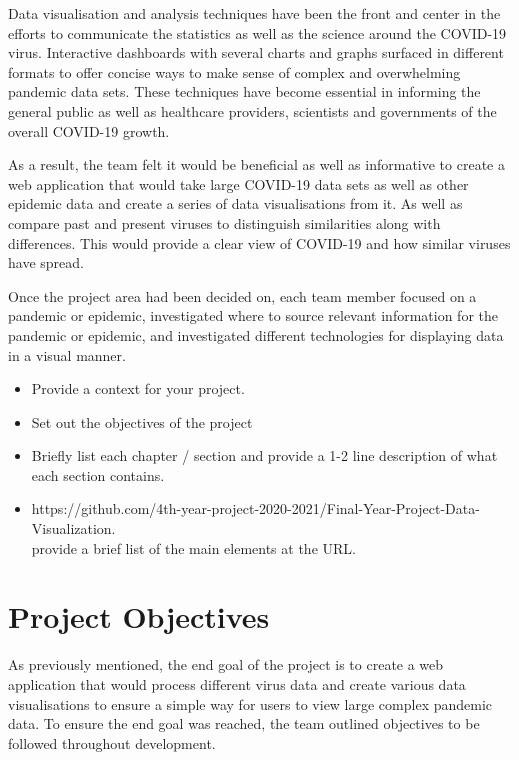 \vspace{5mm} %

Data visualisation and analysis techniques have been the front and center in the efforts to communicate the statistics as well as the science around the COVID-19 virus. Interactive dashboards with several charts and graphs surfaced in different formats to offer concise ways to make sense of complex and overwhelming pandemic data sets. These techniques have become essential in informing the general public as well as healthcare providers, scientists and governments of the overall COVID-19 growth. 

\vspace{5mm} %

As a result, the team felt it would be beneficial as well as informative to create a web application that would take large COVID-19 data sets as well as other epidemic data and create a series of data visualisations from it. As well as compare past and present viruses to distinguish similarities along with differences. This would provide a clear view of COVID-19 and how similar viruses have spread.



\vspace{5mm} %

Once the project area had been decided on, each team member focused on a pandemic or epidemic, investigated where to source relevant information for the pandemic or epidemic, and investigated different technologies for displaying data in a visual manner.

\begin{itemize}
\item Provide a context for your project.
\item Set out the objectives of the project
\item Briefly list each chapter / section and provide a 1-2 line description of what each section contains.
\item https://github.com/4th-year-project-2020-2021/Final-Year-Project-Data-Visualization.
\\provide a brief list of the main elements at the URL.
\end{itemize}

\section{Project Objectives}
As previously mentioned, the end goal of the project is to create a web application that would process different virus data and create various data visualisations to ensure a simple way for users to view large complex pandemic data. To ensure the end goal was reached, the team outlined objectives to be followed throughout development.

